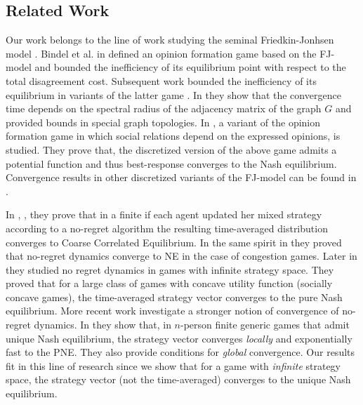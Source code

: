 \subsection{Related Work}
Our work belongs to the line of work studying the seminal Friedkin-Jonhsen
model \cite{FJ90}. Bindel et al. in \cite{BKO11} defined an opinion
formation game based on the FJ-model and bounded the inefficiency
of its equilibrium point with respect to the total disagreement cost.
Subsequent work bounded the inefficiency of its equilibrium in variants
of the latter game \cite{BGM13, EFHS17, CKO13, BFM16}.
In \cite{GS14} they show that the convergence time depends on
the spectral radius of the adjacency matrix of the graph $G$
and provided bounds in special graph topologies.
In \cite{BFM16}, a variant of the opinion formation game in which social
relations depend on the expressed opinions, is studied.
They prove that, the discretized version of the above game admits
a potential function and thus best-response converges to the
Nash equilibrium. Convergence results in other discretized variants of
the FJ-model can be found in \cite{YOASS13, FGV16}.

In \cite{FV97}, \cite{FS99}, \cite{HM00} they prove that in a finite
if each agent updated her mixed strategy according to a no-regret
algorithm the resulting time-averaged distribution converges to
Coarse Correlated Equilibrium. In the same spirit in \cite{BEL06}
they proved that no-regret dynamics converge to NE in the
case of congestion games. Later in \cite{EMN09} they studied no regret
dynamics in games with infinite strategy space. They proved that for a large
class of games with concave utility function (socially concave games), the
time-averaged strategy vector converges to the pure Nash equilibrium.
More recent work investigate a stronger notion of convergence of
no-regret dynamics. In \cite{CHM17} they show that,
in $n$-person finite generic games that admit unique Nash equilibrium,
the strategy vector converges \emph{locally} and exponentially fast
to the PNE. They also provide conditions for \emph{global} convergence.
Our results fit in this line of research since we show that
for a game with \emph{infinite} strategy space, the strategy vector (not the
time-averaged) converges to the unique Nash equilibrium.
